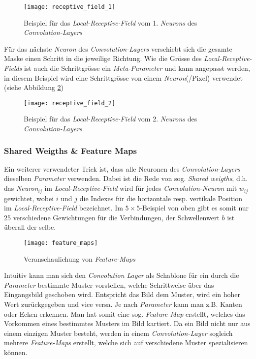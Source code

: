 \begin{figure}[h]
	\ContinuedFloat*
	\centering
	\texttt{[image: receptive\_field\_1]}
	\caption[Beispiel für das \textit{Local-Receptive-Field} 1. \textit{Neuron}]{Beispiel für das \textit{Local-Receptive-Field} vom 1. \textit{Neurons} des \textit{Convolution-Layers}}
	\label{img:rec_field1}
\end{figure}

Für das nächste \textit{Neuron} des \textit{Convolution-Layers} verschiebt sich die gesamte Maske einen Schritt in die jeweilige Richtung. Wie die Grösse des \textit{Local-Receptive-Fields} ist auch die Schrittgrösse ein \textit{Meta-Parameter} und kann angepasst werden, in diesem Beispiel wird eine Schrittgrösse von einem \textit{Neuron}(/Pixel) verwendet (siehe Abbildung \ref{img:rec_field2})

\begin{figure}[h]
	\ContinuedFloat
	\centering
	\texttt{[image: receptive\_field\_2]}
	\caption[Beispiel für das \textit{Local-Receptive-Field} 2. \textit{Neuron}]{Beispiel für das \textit{Local-Receptive-Field} vom 2. \textit{Neurons} des \textit{Convolution-Layers}}
	\label{img:rec_field2}
\end{figure}

\subsubsection{Shared Weigths \& Feature Maps}
Ein weiterer verwendeter Trick ist, dass alle Neuronen des \textit{Convolution-Layers} dieselben \textit{Parameter} verwenden. Dabei ist die Rede von sog. \textit{Shared weigths}, d.h. das \textit{Neuron}$_{ij}$ im \textit{Local-Receptive-Field} wird für jedes \textit{Convolution-Neuron} mit $w_{ij}$ gewichtet, wobei $i$ und $j$ die Indexes für die horizontale resp. vertikale Position im \textit{Local-Receptive-Field} bezeichnet. Im $5\times 5$-Beispiel von oben gibt es somit nur 25 verschiedene Gewichtungen für die Verbindungen, der Schwellenwert $b$ ist überall der selbe.

\begin{figure}[h]
	\centering
	\texttt{[image: feature\_maps]}
	\caption[\textit{Feature-Maps}]{Veranschaulichung von \textit{Feature-Maps}}
	\label{img:feature_maps}
\end{figure}

Intuitiv kann man sich den \textit{Convolution Layer} als Schablone für ein durch die \textit{Parameter} bestimmte Muster vorstellen, welche Schrittweise über das Eingangsbild geschoben wird. Entspricht das Bild dem Muster, wird ein hoher Wert zurückgegeben und vice versa. Je nach \textit{Parameter} kann man z.B. Kanten oder Ecken erkennen. Man hat somit eine sog. \textit{Feature Map} erstellt, welches das Vorkommen eines bestimmtes Musters im Bild kartiert. Da ein Bild nicht nur aus einem einzigen Muster besteht, werden in einem \textit{Convolution-Layer} sogleich mehrere \textit{Feature-Maps} erstellt, welche sich auf verschiedene Muster spezialisieren können.

